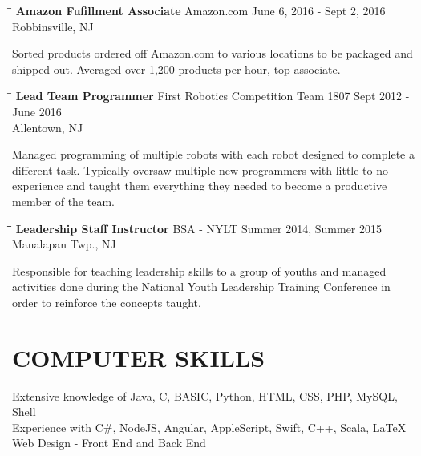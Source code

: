 \documentclass{res}
\begin{document}
\begin{resume}
	 \vspace{-0.2in}
	 \begin{tabbing}
	 \hspace{2.3in}\= \hspace{2.6in}\= \kill %
		{\bf Amazon Fufillment Associate} \>Amazon.com    \>June 6, 2016 - Sept 2, 2016\\
														 \>Robbinsville, NJ
	 \end{tabbing}\vspace{-20pt}      %
		Sorted products ordered off Amazon.com to various locations to be packaged and shipped out. Averaged over 1,200 products per hour, top associate.
	 \vspace{-0.2in}
	 \begin{tabbing}
		\hspace{2.3in}\= \hspace{2.6in}\= \kill %
		{\bf Lead Team Programmer} \>First Robotics Competition Team 1807 \>  Sept 2012 - June 2016 \\
			\>Allentown, NJ
	\end{tabbing}\vspace{-20pt}         %
	Managed programming of multiple robots with each robot designed to complete a different task. Typically oversaw multiple new programmers with little to no experience
	and taught  them everything they needed to become a productive member of the team. 
	\vspace{-0.2in}
	\begin{tabbing}
		\hspace{2.3in}\= \hspace{2.2in}\= \hspace{.4in}\= \kill %
		{\bf Leadership Staff Instructor}  \>BSA - NYLT \> Summer 2014, Summer 2015\\
		\>Manalapan Twp., NJ
	\end{tabbing}\vspace{-20pt}            %
	Responsible for teaching leadership skills to a group of youths and managed activities done during the National Youth Leadership Training Conference in order to reinforce the concepts taught.
\vspace{-0.2in}
\section{COMPUTER SKILLS}          
		Extensive knowledge of Java, C, BASIC, Python, HTML, CSS, PHP, MySQL, Shell  \\ 
		Experience with C\#, NodeJS, Angular, AppleScript, Swift, C++, Scala, \LaTeX\\
		Web Design - Front End and Back End
\vspace{-0.2in}

\end{resume}
\end{document}
